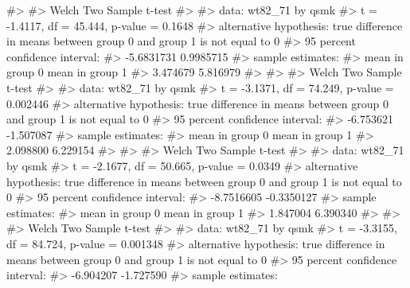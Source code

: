 \documentclass[
  10pt,
  a4paper,
]{book}
\newenvironment{Shaded}{\begin{snugshade}}{\end{snugshade}}
\newcommand{\CommentTok}[1]{\textcolor[rgb]{0.37,0.37,0.37}{#1}}
\begin{document}
\begin{Shaded}
\begin{Highlighting}[]
\CommentTok{\#\textgreater{} }
\CommentTok{\#\textgreater{}  Welch Two Sample t{-}test}
\CommentTok{\#\textgreater{} }
\CommentTok{\#\textgreater{} data:  wt82\_71 by qsmk}
\CommentTok{\#\textgreater{} t = {-}1.4117, df = 45.444, p{-}value = 0.1648}
\CommentTok{\#\textgreater{} alternative hypothesis: true difference in means between group 0 and group 1 is not equal to 0}
\CommentTok{\#\textgreater{} 95 percent confidence interval:}
\CommentTok{\#\textgreater{}  {-}5.6831731  0.9985715}
\CommentTok{\#\textgreater{} sample estimates:}
\CommentTok{\#\textgreater{} mean in group 0 mean in group 1 }
\CommentTok{\#\textgreater{}        3.474679        5.816979 }
\CommentTok{\#\textgreater{} }
\CommentTok{\#\textgreater{} }
\CommentTok{\#\textgreater{}  Welch Two Sample t{-}test}
\CommentTok{\#\textgreater{} }
\CommentTok{\#\textgreater{} data:  wt82\_71 by qsmk}
\CommentTok{\#\textgreater{} t = {-}3.1371, df = 74.249, p{-}value = 0.002446}
\CommentTok{\#\textgreater{} alternative hypothesis: true difference in means between group 0 and group 1 is not equal to 0}
\CommentTok{\#\textgreater{} 95 percent confidence interval:}
\CommentTok{\#\textgreater{}  {-}6.753621 {-}1.507087}
\CommentTok{\#\textgreater{} sample estimates:}
\CommentTok{\#\textgreater{} mean in group 0 mean in group 1 }
\CommentTok{\#\textgreater{}        2.098800        6.229154 }
\CommentTok{\#\textgreater{} }
\CommentTok{\#\textgreater{} }
\CommentTok{\#\textgreater{}  Welch Two Sample t{-}test}
\CommentTok{\#\textgreater{} }
\CommentTok{\#\textgreater{} data:  wt82\_71 by qsmk}
\CommentTok{\#\textgreater{} t = {-}2.1677, df = 50.665, p{-}value = 0.0349}
\CommentTok{\#\textgreater{} alternative hypothesis: true difference in means between group 0 and group 1 is not equal to 0}
\CommentTok{\#\textgreater{} 95 percent confidence interval:}
\CommentTok{\#\textgreater{}  {-}8.7516605 {-}0.3350127}
\CommentTok{\#\textgreater{} sample estimates:}
\CommentTok{\#\textgreater{} mean in group 0 mean in group 1 }
\CommentTok{\#\textgreater{}        1.847004        6.390340 }
\CommentTok{\#\textgreater{} }
\CommentTok{\#\textgreater{} }
\CommentTok{\#\textgreater{}  Welch Two Sample t{-}test}
\CommentTok{\#\textgreater{} }
\CommentTok{\#\textgreater{} data:  wt82\_71 by qsmk}
\CommentTok{\#\textgreater{} t = {-}3.3155, df = 84.724, p{-}value = 0.001348}
\CommentTok{\#\textgreater{} alternative hypothesis: true difference in means between group 0 and group 1 is not equal to 0}
\CommentTok{\#\textgreater{} 95 percent confidence interval:}
\CommentTok{\#\textgreater{}  {-}6.904207 {-}1.727590}
\CommentTok{\#\textgreater{} sample estimates:}

\end{Highlighting}
\end{Shaded}
\end{document}
